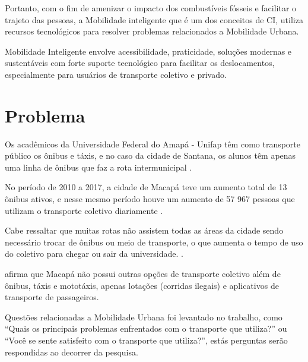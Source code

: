 Portanto, com o fim de amenizar o impacto dos combustíveis fósseis e facilitar o trajeto das pessoas, a  Mobilidade inteligente que é um dos conceitos de CI, utiliza recursos tecnológicos para resolver problemas relacionados a Mobilidade Urbana.

Mobilidade Inteligente envolve acessibilidade, praticidade, soluções modernas e sustentáveis com forte suporte tecnológico para facilitar os deslocamentos, especialmente para usuários de transporte coletivo e privado.

\section {Problema}
\begin{comment}
	Na cidade de Macapá e Santana, as duas maiores cidade do Amapá, o número de transporte coletivo é baixo,
	existe apenas duas rodovias que interligam as cidades, 
	se locomover se torna difícil \cite{sau2018}. %
	
	Com tantos problemas aparentes causadas pelo grande inchaço populacional que  vive nas áreas urbanas, cerca de 80\% da população das duas cidades reside em áreas urbanas e sofre com a insuficiência do sistema de transporte público oferecido \cite{tostes}.
\end{comment}

Os acadêmicos da Universidade Federal do Amapá - Unifap têm como transporte público os ônibus e táxis, e no caso da cidade de Santana, os alunos têm apenas uma linha de ônibus que faz a rota intermunicipal \cite{sau2018}.

No período de 2010 a 2017, a cidade de Macapá teve um aumento total de 13 ônibus ativos, e nesse mesmo período houve um aumento de 57 967 pessoas que utilizam o transporte coletivo diariamente \cite{sau2018}. %
 
Cabe ressaltar que muitas rotas não assistem todas as áreas da cidade sendo necessário trocar de ônibus ou meio de transporte, o que aumenta o tempo de uso do coletivo para chegar ou sair da universidade. \cite{galiano}.

 afirma que Macapá não possui outras opções de transporte coletivo além de ônibus, táxis e mototáxis, apenas lotações (corridas ilegais) e aplicativos de transporte de passageiros.

Questões relacionadas a Mobilidade Urbana foi levantado no trabalho, como ``Quais os principais problemas enfrentados com o transporte que utiliza?'' ou ``Você se sente satisfeito com o transporte que utiliza?'', estás perguntas serão respondidas ao decorrer da pesquisa.






